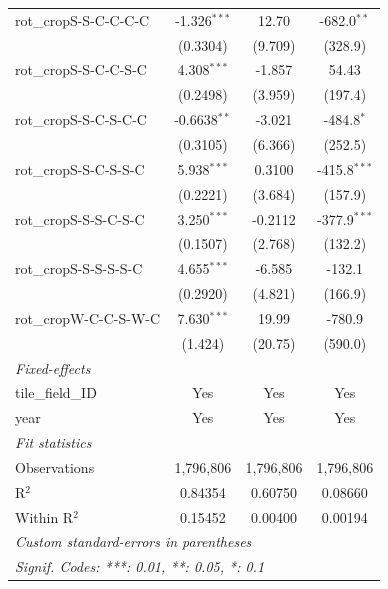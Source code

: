 \begin{tabular}{lccc}
   rot\_cropS-S-C-C-C-C  & -1.326$^{***}$  & 12.70        & -682.0$^{**}$\\   
                         & (0.3304)        & (9.709)      & (328.9)\\   
   rot\_cropS-S-C-C-S-C  & 4.308$^{***}$   & -1.857       & 54.43\\   
                         & (0.2498)        & (3.959)      & (197.4)\\   
   rot\_cropS-S-C-S-C-C  & -0.6638$^{**}$  & -3.021       & -484.8$^{*}$\\   
                         & (0.3105)        & (6.366)      & (252.5)\\   
   rot\_cropS-S-C-S-S-C  & 5.938$^{***}$   & 0.3100       & -415.8$^{***}$\\   
                         & (0.2221)        & (3.684)      & (157.9)\\   
   rot\_cropS-S-S-C-S-C  & 3.250$^{***}$   & -0.2112      & -377.9$^{***}$\\   
                         & (0.1507)        & (2.768)      & (132.2)\\   
   rot\_cropS-S-S-S-S-C  & 4.655$^{***}$   & -6.585       & -132.1\\   
                         & (0.2920)        & (4.821)      & (166.9)\\   
   rot\_cropW-C-C-S-W-C  & 7.630$^{***}$   & 19.99        & -780.9\\   
                         & (1.424)         & (20.75)      & (590.0)\\   
   \midrule
   \emph{Fixed-effects}\\
   tile\_field\_ID       & Yes             & Yes          & Yes\\  
   year                  & Yes             & Yes          & Yes\\  
   \midrule
   \emph{Fit statistics}\\
   Observations          & 1,796,806       & 1,796,806    & 1,796,806\\  
   R$^2$                 & 0.84354         & 0.60750      & 0.08660\\  
   Within R$^2$          & 0.15452         & 0.00400      & 0.00194\\  
   \midrule \midrule
   \multicolumn{4}{l}{\emph{Custom standard-errors in parentheses}}\\
   \multicolumn{4}{l}{\emph{Signif. Codes: ***: 0.01, **: 0.05, *: 0.1}}\\
\end{tabular}
\par\endgroup


